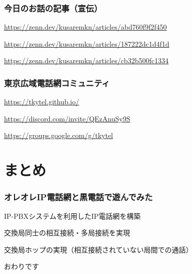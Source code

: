 \documentclass[
  lualatex,
  aspectratio=169,
  14pt
]{beamer}
\begin{document}
\begin{frame}
  \frametitle{今日のお話の記事（宣伝）}

  \begin{description}[labelwidth=\linewidth,itemsep=\zh]
    \item[いまさらVoIP網]
      {\small
      \url{https://zenn.dev/kusaremkn/articles/abd760f9f2f450}}
    \item[VoIPルータを使って黒電話をIP電話機にする]
      {\small
      \url{https://zenn.dev/kusaremkn/articles/187222dc1d4f1d}}
    \item[ICOM VE-TA10を使うためにパケットを書き換えたりする]
      {\small
      \url{https://zenn.dev/kusaremkn/articles/cb32b500fc1334}}
  \end{description}
\end{frame}

\begin{frame}
  \frametitle{東京広域電話網コミュニティ}

  \begin{description}[labelwidth=\linewidth,itemsep=\zh]
    \item[Web site]
      {\small
      \url{https://tkytel.github.io/}}
    \item[Discord]
      {\small
      \url{https://discord.com/invite/QEzAnuSy9S}}
    \item[Mailing list]
      {\small
      \url{https://groups.google.com/g/tkytel}}
  \end{description}
\end{frame}

\section{まとめ}

\begin{frame}
  \frametitle{オレオレIP電話網と黒電話で遊んでみた}

  IP-PBXシステムを利用したIP電話網を構築

  交換局同士の相互接続・多局接続を実現

  交換局ホップの実現（相互接続されていない局間での通話）

\end{frame}

\begin{frame}[standout]
  おわりです
\end{frame}
\end{document}
